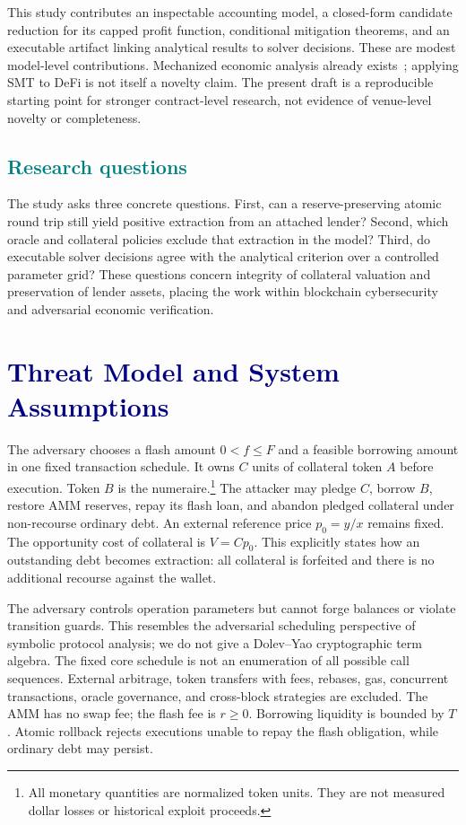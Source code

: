 \documentclass[conference]{IEEEtran}
\begin{document}
This study contributes an inspectable accounting model, a closed-form candidate
reduction for its capped profit function, conditional mitigation theorems, and
an executable artifact linking analytical results to solver decisions. These
are modest model-level contributions. Mechanized economic analysis already
exists~\cite{clockwork,defiposer}; applying SMT to DeFi is not itself a novelty
claim. The present draft is a reproducible starting point for stronger
contract-level research, not evidence of venue-level novelty or completeness.

\subsection{\textcolor{Teal}{Research questions}}
The study asks three concrete questions. First, can a reserve-preserving atomic
round trip still yield positive extraction from an attached lender? Second,
which oracle and collateral policies exclude that extraction in the model?
Third, do executable solver decisions agree with the analytical criterion over
a controlled parameter grid? These questions concern integrity of collateral
valuation and preservation of lender assets, placing the work within blockchain
cybersecurity and adversarial economic verification.

\section{\textcolor{Navy}{Threat Model and System Assumptions}}
The adversary chooses a flash amount $0<f\leq F$ and a feasible borrowing amount
in one fixed transaction schedule. It owns $C$ units of collateral token $A$
before execution. Token $B$ is the numeraire.\footnote{All monetary quantities are normalized token units. They are not measured dollar losses or historical exploit proceeds.} The attacker may pledge $C$,
borrow $B$, restore AMM reserves, repay its flash loan, and abandon pledged
collateral under non-recourse ordinary debt. An external reference price
$p_0=y/x$ remains fixed. The opportunity cost of collateral is $V=Cp_0$.
This explicitly states how an outstanding debt becomes extraction: all
collateral is forfeited and there is no additional recourse against the wallet.

The adversary controls operation parameters but cannot forge balances or
violate transition guards. This resembles the adversarial scheduling perspective
of symbolic protocol analysis; we do not give a Dolev--Yao cryptographic term
algebra. The fixed core schedule is not an enumeration of all possible call
sequences. External arbitrage, token transfers with fees, rebases, gas,
concurrent transactions, oracle governance, and cross-block strategies are
excluded. The AMM has no swap fee; the flash fee is $r\geq0$. Borrowing liquidity
is bounded by $T$. Atomic rollback rejects executions unable to repay the
flash obligation, while ordinary debt may persist.
\end{document}
